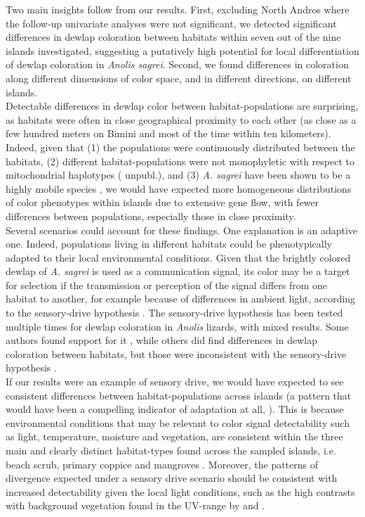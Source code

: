 Two main insights follow from our results. First, excluding North Andros where the follow-up univariate analyses were not significant, we detected significant differences in dewlap coloration between habitats within seven out of the nine islands investigated, suggesting a putatively high potential for local differentiation of dewlap coloration in \textit{Anolis sagrei}. Second, we found differences in coloration along different dimensions of color space, and in different directions, on different islands.\\

Detectable differences in dewlap color between habitat-populations are surprising, as habitats were often in close geographical proximity to each other (as close as a few hundred meters on Bimini and most of the time within ten kilometers). Indeed, given that (1) the populations were continuously distributed between the habitats, (2) different habitat-populations were not monophyletic with respect to mitochondrial haplotypes (\citealt{vandeSchoot2016} unpubl.), and (3) \textit{A. sagrei} have been shown to be a highly mobile species \citep{Kamath2018}, we would have expected more homogeneous distributions of color phenotypes within islands due to extensive gene flow, with fewer differences between populations, especially those in close proximity.\\

Several scenarios could account for these findings. One explanation is an adaptive one. Indeed, populations living in different habitats could be phenotypically adapted to their local environmental conditions. Given that the brightly colored dewlap of \textit{A. sagrei} is used as a communication signal, its color may be a target for selection if the transmission or perception of the signal differs from one habitat to another, for example because of differences in ambient light, according to the sensory-drive hypothesis \citep{Endler1988, Endler1992, Endler1998}. The sensory-drive hypothesis has been tested multiple times for dewlap coloration in \textit{Anolis} lizards, with mixed results. Some authors found support for it \citep{Leal2002, Leal2004}, while others did find differences in dewlap coloration between habitats, but those were inconsistent with the sensory-drive hypothesis \citep{Fleishman2009, Ng2012}.\\

If our results were an example of sensory drive, we would have expected to see consistent differences between habitat-populations across islands (a pattern that would have been a compelling indicator of adaptation at all, \citealt{Losos2011}). This is because environmental conditions that may be relevant to color signal detectability such as light, temperature, moisture and vegetation, are consistent within the three main and clearly distinct habitat-types found across the sampled islands, i.e. beach scrub, primary coppice and mangroves \citep{Howard1950, Schoener1968}. Moreover, the patterns of divergence expected under a sensory drive scenario should be consistent with increased detectability given the local light conditions, such as the high contrasts with background vegetation found in the UV-range by \citet{Leal2002} and \citet{Leal2004}.\\

